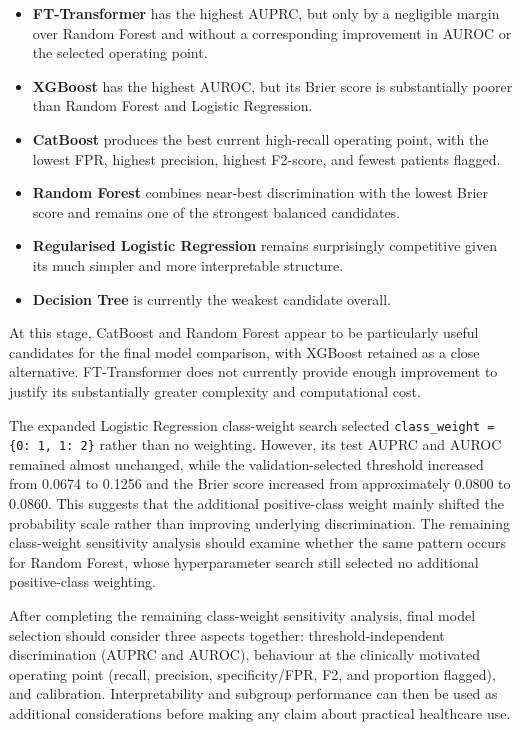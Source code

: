 \documentclass[11pt,a4paper]{article}
\begin{document}
\begin{itemize}
    \item \textbf{FT-Transformer} has the highest AUPRC, but only by a negligible margin over Random Forest and without a corresponding improvement in AUROC or the selected operating point.
    \item \textbf{XGBoost} has the highest AUROC, but its Brier score is substantially poorer than Random Forest and Logistic Regression.
    \item \textbf{CatBoost} produces the best current high-recall operating point, with the lowest FPR, highest precision, highest F2-score, and fewest patients flagged.
    \item \textbf{Random Forest} combines near-best discrimination with the lowest Brier score and remains one of the strongest balanced candidates.
    \item \textbf{Regularised Logistic Regression} remains surprisingly competitive given its much simpler and more interpretable structure.
    \item \textbf{Decision Tree} is currently the weakest candidate overall.
\end{itemize}

At this stage, CatBoost and Random Forest appear to be particularly useful candidates for the final model comparison, with XGBoost retained as a close alternative. FT-Transformer does not currently provide enough improvement to justify its substantially greater complexity and computational cost.

The expanded Logistic Regression class-weight search selected \texttt{class\_weight = \{0: 1, 1: 2\}} rather than no weighting. However, its test AUPRC and AUROC remained almost unchanged, while the validation-selected threshold increased from 0.0674 to 0.1256 and the Brier score increased from approximately 0.0800 to 0.0860. This suggests that the additional positive-class weight mainly shifted the probability scale rather than improving underlying discrimination. The remaining class-weight sensitivity analysis should examine whether the same pattern occurs for Random Forest, whose hyperparameter search still selected no additional positive-class weighting.

After completing the remaining class-weight sensitivity analysis, final model selection should consider three aspects together: threshold-independent discrimination (AUPRC and AUROC), behaviour at the clinically motivated operating point (recall, precision, specificity/FPR, F2, and proportion flagged), and calibration. Interpretability and subgroup performance can then be used as additional considerations before making any claim about practical healthcare use.
\end{document}
